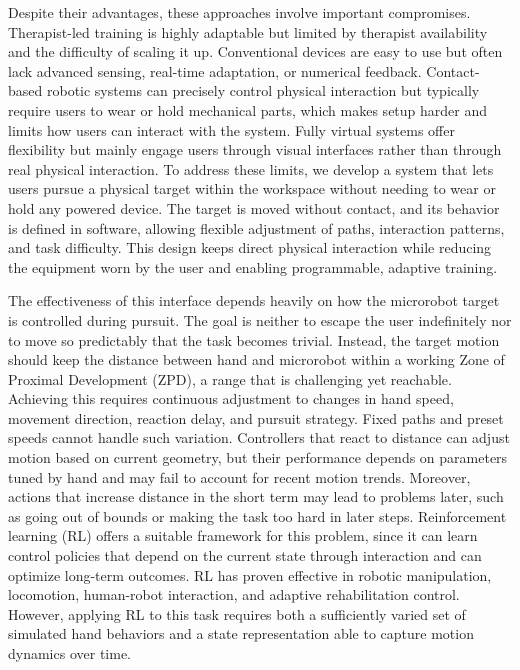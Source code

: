 \documentclass[letterpaper,journal]{IEEEtran}
\begin{document}
Despite their advantages, these approaches involve important compromises. Therapist-led training is highly adaptable but limited by therapist availability and the difficulty of scaling it up. Conventional devices are easy to use but often lack advanced sensing, real-time adaptation, or numerical feedback. Contact-based robotic systems can precisely control physical interaction but typically require users to wear or hold mechanical parts, which makes setup harder and limits how users can interact with the system. Fully virtual systems offer flexibility but mainly engage users through visual interfaces rather than through real physical interaction. To address these limits, we develop a system that lets users pursue a physical target within the workspace without needing to wear or hold any powered device. The target is moved without contact, and its behavior is defined in software, allowing flexible adjustment of paths, interaction patterns, and task difficulty. This design keeps direct physical interaction while reducing the equipment worn by the user and enabling programmable, adaptive training.

The effectiveness of this interface depends heavily on how the microrobot target is controlled during pursuit. The goal is neither to escape the user indefinitely nor to move so predictably that the task becomes trivial. Instead, the target motion should keep the distance between hand and microrobot within a working Zone of Proximal Development (ZPD), a range that is challenging yet reachable. Achieving this requires continuous adjustment to changes in hand speed, movement direction, reaction delay, and pursuit strategy. Fixed paths and preset speeds cannot handle such variation. Controllers that react to distance can adjust motion based on current geometry, but their performance depends on parameters tuned by hand and may fail to account for recent motion trends. Moreover, actions that increase distance in the short term may lead to problems later, such as going out of bounds or making the task too hard in later steps. Reinforcement learning (RL) offers a suitable framework for this problem, since it can learn control policies that depend on the current state through interaction and can optimize long-term outcomes. RL has proven effective in robotic manipulation, locomotion, human-robot interaction, and adaptive rehabilitation control. However, applying RL to this task requires both a sufficiently varied set of simulated hand behaviors and a state representation able to capture motion dynamics over time.
\end{document}
